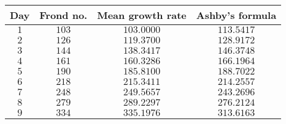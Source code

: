 \begin{tabular}{cccc}                                  \toprule
Day & Frond no. & Mean growth rate & Ashby's formula \\\midrule
$1$ & $103$     & $103.0000$       & $113.5417$      \\[4pt]
$2$ & $126$     & $119.3700$       & $128.9172$      \\[4pt]
$3$ & $144$     & $138.3417$       & $146.3748$      \\[4pt]
$4$ & $161$     & $160.3286$       & $166.1964$      \\[4pt]
$5$ & $190$     & $185.8100$       & $188.7022$      \\[4pt]
$6$ & $218$     & $215.3411$       & $214.2557$      \\[4pt]
$7$ & $248$     & $249.5657$       & $243.2696$      \\[4pt]
$8$ & $279$     & $289.2297$       & $276.2124$      \\[4pt]
$9$ & $334$     & $335.1976$       & $313.6163$      \\\bottomrule
\end{tabular}
